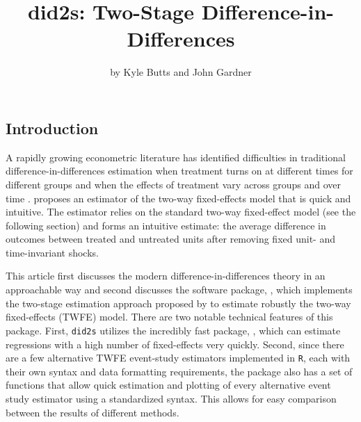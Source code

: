 \title{did2s: Two-Stage Difference-in-Differences}
\author{by Kyle Butts and John Gardner}

\maketitle


\hypertarget{introduction}{%
\subsection{Introduction}\label{introduction}}

A rapidly growing econometric literature has identified difficulties in
traditional difference-in-differences estimation when treatment turns on
at different times for different groups and when the effects of
treatment vary across groups and over time
\citep{Callaway_SantAnna_2020, Sun_Abraham_2020, Goodman-Bacon_2018, Borusyak_Jaravel_Spiess_2021, deChaisemartin_DHaultfoeuille_2019}.
\citet{Gardner_2021} proposes an estimator of the two-way fixed-effects
model that is quick and intuitive. The estimator relies on the standard
two-way fixed-effect model (see the following section) and forms an
intuitive estimate: the average difference in outcomes between treated
and untreated units after removing fixed unit- and time-invariant
shocks.

This article first discusses the modern difference-in-differences theory
in an approachable way and second discusses the software package,
, which implements the two-stage estimation approach
proposed by \citet{Gardner_2021} to estimate robustly the two-way
fixed-effects (TWFE) model. There are two notable technical features of
this package. First, \texttt{did2s} utilizes the incredibly fast
package,  \citep{Berge_2018}, which can estimate
regressions with a high number of fixed-effects very quickly. Second,
since there are a few alternative TWFE event-study estimators
implemented in \texttt{R}, each with their own syntax and data
formatting requirements, the package also has a set of functions that
allow quick estimation and plotting of every alternative event study
estimator using a standardized syntax. This allows for easy comparison
between the results of different methods.

